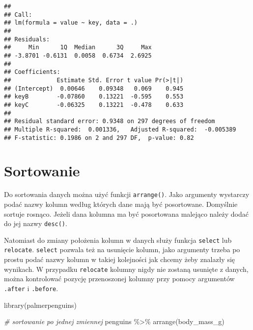 \documentclass[
]{book}
\newenvironment{Shaded}{\begin{snugshade}}{\end{snugshade}}
\newcommand{\CommentTok}[1]{\textcolor[rgb]{0.56,0.35,0.01}{\textit{#1}}}
\newcommand{\FunctionTok}[1]{\textcolor[rgb]{0.00,0.00,0.00}{#1}}
\newcommand{\NormalTok}[1]{#1}
\newcommand{\SpecialCharTok}[1]{\textcolor[rgb]{0.00,0.00,0.00}{#1}}
\begin{document}
\begin{verbatim}
## 
## Call:
## lm(formula = value ~ key, data = .)
## 
## Residuals:
##     Min      1Q  Median      3Q     Max 
## -3.8701 -0.6131  0.0058  0.6734  2.6925 
## 
## Coefficients:
##             Estimate Std. Error t value Pr(>|t|)
## (Intercept)  0.00646    0.09348   0.069    0.945
## keyB        -0.07860    0.13221  -0.595    0.553
## keyC        -0.06325    0.13221  -0.478    0.633
## 
## Residual standard error: 0.9348 on 297 degrees of freedom
## Multiple R-squared:  0.001336,   Adjusted R-squared:  -0.005389 
## F-statistic: 0.1986 on 2 and 297 DF,  p-value: 0.82
\end{verbatim}

\hypertarget{sortowanie}{%
\section{Sortowanie}\label{sortowanie}}

Do sortowania danych można użyć funkcji \texttt{arrange()}. Jako argumenty wystarczy podać nazwy kolumn według których dane mają być posortowane. Domyślnie sortuje rosnąco. Jeżeli dana kolumna ma być posortowana malejąco należy dodać do jej nazwy \texttt{desc()}.

Natomiast do zmiany położenia kolumn w danych służy funkcja \texttt{select} lub \texttt{relocate}. \texttt{select} pozwala też na usunięcie kolumn, jako argumenty trzeba po prostu podać nazwy kolumn w takiej kolejności jak chcemy żeby znalazły się wynikach. W przypadku \texttt{relocate} kolumny nigdy nie zostaną usunięte z danych, można kontrolować pozycję przenoszonej kolumny przy pomocy argumentów \texttt{.after} i \texttt{.before}.

\begin{Shaded}
\begin{Highlighting}[]
\FunctionTok{library}\NormalTok{(palmerpenguins)}

\CommentTok{\# sortowanie po jednej zmiennej}
\NormalTok{penguins }\SpecialCharTok{\%\textgreater{}\%} \FunctionTok{arrange}\NormalTok{(body\_mass\_g)}
\end{Highlighting}
\end{Shaded}
\end{document}
